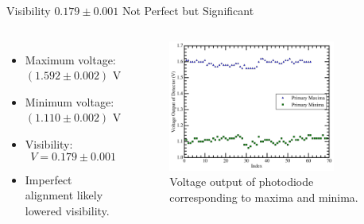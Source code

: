 \documentclass[aspectratio = 169]{beamer}
\begin{document}
\begin{frame}{Visibility $0.179\pm 0.001$ Not Perfect but Significant}
\begin{columns}
    \begin{itemize}
        \item Maximum voltage: $(1.592\pm0.002)\text{ V}$
        \item Minimum voltage: $(1.110\pm0.002)\text{ V}$
        \item Visibility:
        \[
        V = 0.179\pm0.001
        \]
        \item Imperfect alignment likely lowered visibility.
    \end{itemize}
    
        \begin{figure}
        \centering
        \includegraphics[width=0.8\textwidth]{fig/Intensity.png}
        \caption{Voltage output of photodiode corresponding to maxima and minima.}
    \end{figure}
\end{columns}

\end{frame}
\end{document}
